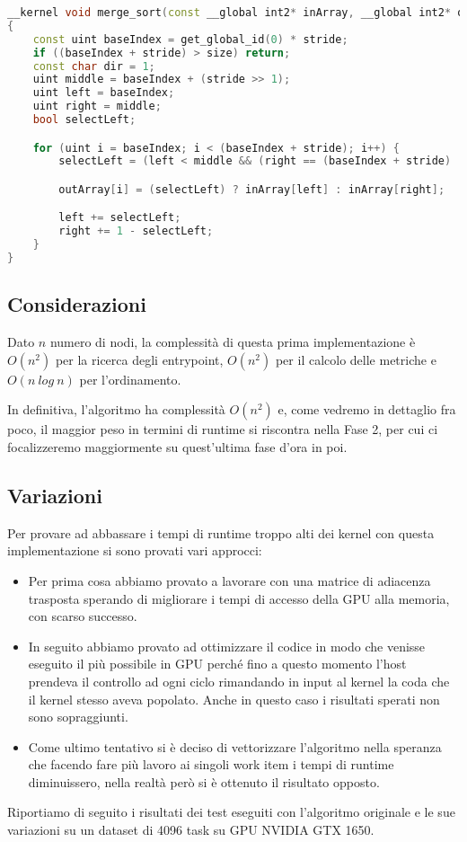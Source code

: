 \documentclass[../relazione.tex]{subfiles}
\begin{document}
\begin{lstlisting}[language=C++, caption={MergeSort kernel for metrics couple array, source: \url{https://github.com/Gram21/GPUSorting}},captionpos=b]
__kernel void merge_sort(const __global int2* inArray, __global int2* outArray, const uint stride, const uint size)
{
	const uint baseIndex = get_global_id(0) * stride;
	if ((baseIndex + stride) > size) return;
	const char dir = 1;
	uint middle = baseIndex + (stride >> 1);
	uint left = baseIndex;
	uint right = middle;
	bool selectLeft;

	for (uint i = baseIndex; i < (baseIndex + stride); i++) {
		selectLeft = (left < middle && (right == (baseIndex + stride) || lte(inArray[left], inArray[right]))) == dir;

		outArray[i] = (selectLeft) ? inArray[left] : inArray[right];

		left += selectLeft;
		right += 1 - selectLeft;
	}
}
\end{lstlisting}

\subsection{Considerazioni}
Dato $n$ numero di nodi, la complessità di questa prima implementazione è $O(n^2)$ per la ricerca degli entrypoint, $O(n^2)$ per il calcolo delle metriche e $O(n\ log\ n)$ per l'ordinamento.

In definitiva, l'algoritmo ha complessità $O(n^2)$ e, come vedremo in dettaglio fra poco, il maggior peso in termini di runtime si riscontra nella Fase 2, per cui ci focalizzeremo maggiormente su quest'ultima fase d'ora in poi.

\subsection{Variazioni}
Per provare ad abbassare i tempi di runtime troppo alti dei kernel con questa implementazione si sono provati vari approcci:
\begin{itemize}
    \item Per prima cosa abbiamo provato a lavorare con una matrice di adiacenza trasposta sperando di migliorare i tempi di accesso della GPU alla memoria, con scarso successo.
    \item In seguito abbiamo provato ad ottimizzare il codice in modo che venisse eseguito il più possibile in GPU perché fino a questo momento l'host prendeva il controllo ad ogni ciclo rimandando in input al kernel la coda che il kernel stesso aveva popolato. Anche in questo caso i risultati sperati non sono sopraggiunti.
    \item Come ultimo tentativo si è deciso di vettorizzare l'algoritmo nella speranza che facendo fare più lavoro ai singoli work item i tempi di runtime diminuissero, nella realtà però si è ottenuto il risultato opposto.
\end{itemize}    
Riportiamo di seguito i risultati dei test eseguiti con l'algoritmo originale e 
le sue variazioni su un dataset di 4096 task su GPU NVIDIA GTX 1650.
\end{document}
